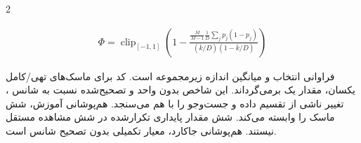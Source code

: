 \documentclass[10pt,a4paper]{article}
\begin{document}
\begin{multicols}{2}
\begin{latin}\begin{equation}\begin{gathered}\Phi=\operatorname{clip}_{[-1,1]}\left(1-\frac{\frac{M}{M-1}\frac{1}{D}\sum_j p_j(1-p_j)}{(\bar k/D)(1-\bar k/D)}\right)\end{gathered}\end{equation}\end{latin}
 فراوانی انتخاب و  میانگین اندازه زیرمجموعه است. کد برای ماسک‌های تهی/کامل یکسان، مقدار یک برمی‌گرداند. این شاخص بدون واحد و تصحیح‌شده نسبت به شانس \lr{[2]}، تغییر ناشی از تقسیم داده و جست‌وجو را با هم می‌سنجد. هم‌پوشانی آموزش، شش ماسک را وابسته می‌کند. شش مقدار پایداری تکرارشده در  شش مشاهده مستقل نیستند. هم‌پوشانی جاکارد، معیار تکمیلی بدون تصحیح شانس است.


\end{multicols}
\end{document}

